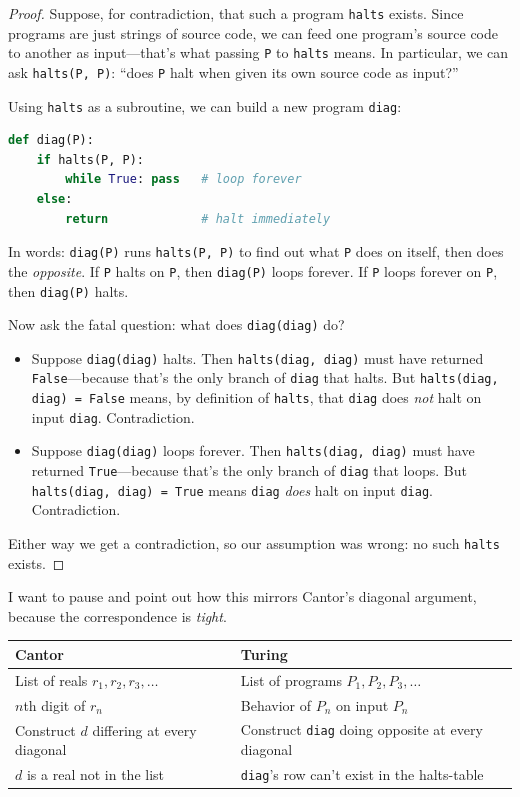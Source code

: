 \documentclass[11pt]{article}
\begin{document}
\begin{proof}
Suppose, for contradiction, that such a program \texttt{halts} exists. Since programs are just strings of source code, we can feed one program's source code to another as input---that's what passing \texttt{P} to \texttt{halts} means. In particular, we can ask \texttt{halts(P, P)}: ``does \texttt{P} halt when given its own source code as input?''

Using \texttt{halts} as a subroutine, we can build a new program \texttt{diag}:

\begin{lstlisting}[language=Python]
def diag(P):
    if halts(P, P):
        while True: pass   # loop forever
    else:
        return             # halt immediately
\end{lstlisting}

In words: \texttt{diag(P)} runs \texttt{halts(P, P)} to find out what \texttt{P} does on itself, then does the \emph{opposite}. If \texttt{P} halts on \texttt{P}, then \texttt{diag(P)} loops forever. If \texttt{P} loops forever on \texttt{P}, then \texttt{diag(P)} halts.

Now ask the fatal question: what does \texttt{diag(diag)} do?

\begin{itemize}
  \item Suppose \texttt{diag(diag)} halts. Then \texttt{halts(diag, diag)} must have returned \texttt{False}---because that's the only branch of \texttt{diag} that halts. But \texttt{halts(diag, diag) = False} means, by definition of \texttt{halts}, that \texttt{diag} does \emph{not} halt on input \texttt{diag}. Contradiction.
  \item Suppose \texttt{diag(diag)} loops forever. Then \texttt{halts(diag, diag)} must have returned \texttt{True}---because that's the only branch of \texttt{diag} that loops. But \texttt{halts(diag, diag) = True} means \texttt{diag} \emph{does} halt on input \texttt{diag}. Contradiction.
\end{itemize}

Either way we get a contradiction, so our assumption was wrong: no such \texttt{halts} exists.
\end{proof}

I want to pause and point out how this mirrors Cantor's diagonal argument, because the correspondence is \emph{tight}.

\begin{center}
\begin{tabular}{ll}
\toprule
\textbf{Cantor} & \textbf{Turing} \\
\midrule
List of reals $r_1, r_2, r_3, \ldots$ & List of programs $P_1, P_2, P_3, \ldots$ \\
$n$th digit of $r_n$ & Behavior of $P_n$ on input $P_n$ \\
Construct $d$ differing at every diagonal & Construct \texttt{diag} doing opposite at every diagonal \\
$d$ is a real not in the list & \texttt{diag}'s row can't exist in the halts-table \\
\bottomrule
\end{tabular}
\end{center}
\end{document}
